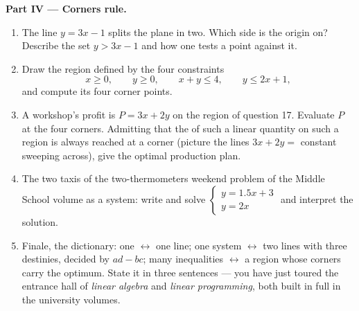\begin{problem}
\medskip
\noindent\textbf{Part IV --- Corners rule.}
\begin{enumerate}[resume]
  \item The line $y = 3x - 1$ splits the plane in two. Which
        side is the origin on? Describe the set
        $y > 3x - 1$ and how one tests a point against it.
  \item Draw the region defined by the four constraints
        \[
        x \geq 0, \qquad y \geq 0, \qquad x + y \leq 4,
        \qquad y \leq 2x + 1,
        \]
        and compute its four corner points.
  \item A workshop's profit is $P = 3x + 2y$ on the region of
        question 17. Evaluate $P$ at the four corners. Admitting
        that the  of such a linear quantity on such a
        region is always reached at a corner (picture the lines
        $3x + 2y = $ constant sweeping across), give the optimal
        production plan.
  \item The two taxis of the two-thermometers weekend problem of the Middle School volume as a system:
        write and solve
        $\begin{cases} y = 1.5x + 3 \\ y = 2x \end{cases}$ and
        interpret the solution.
  \item Finale, the dictionary: one  $\leftrightarrow$
        one line; one system $\leftrightarrow$ two lines with
        three destinies, decided by $ad - bc$; many inequalities
        $\leftrightarrow$ a region whose corners carry the
        optimum. State it in three sentences --- you have just
        toured the entrance hall of \emph{linear algebra} and
        \emph{linear programming}, both built in full in the
        university volumes.
\end{enumerate}
\end{problem}
